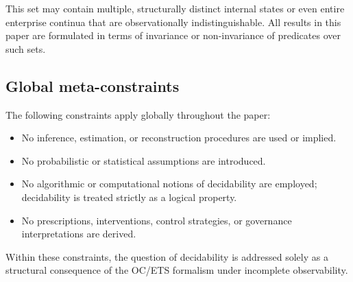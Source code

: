 This set may contain multiple, structurally distinct internal states or
even entire enterprise continua that are observationally
indistinguishable. All results in this paper are formulated in terms of
invariance or non-invariance of predicates over such sets.

\subsection{Global meta-constraints}
\label{subsec:meta-constraints}

The following constraints apply globally throughout the paper:
\begin{itemize}
\item No inference, estimation, or reconstruction procedures are used or
      implied.
\item No probabilistic or statistical assumptions are introduced.
\item No algorithmic or computational notions of decidability are
      employed; decidability is treated strictly as a logical property.
\item No prescriptions, interventions, control strategies, or
      governance interpretations are derived.
\end{itemize}

Within these constraints, the question of decidability is addressed
solely as a structural consequence of the OC/ETS formalism under
incomplete observability.
